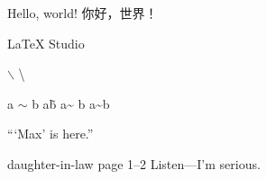 \documentclass[a4paper]{ctexart}
\begin{document}
	Hello, world!
	你好，世界！

	\LaTeX{} Studio

	$\backslash$ \textbackslash \texttt{}

	a $\sim$ b
	a\~ b
	a\~{} b
	a\textasciitilde b

	``\thinspace `Max' is here.''

	daughter-in-law
	page 1--2
	Listen---I'm serious.
\end{document}
